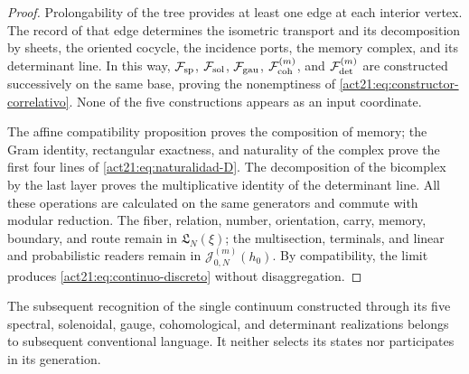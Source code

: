 \begin{proof}
Prolongability of the tree provides at least one edge at each interior
vertex. The record of that edge determines the isometric transport and its
decomposition by sheets, the oriented cocycle, the incidence ports, the
memory complex, and its determinant line. In this way,
\(\mathcal F_{\rm sp}\), \(\mathcal F_{\rm sol}\),
\(\mathcal F_{\rm gau}\), \(\mathcal F_{\rm coh}^{(m)}\), and
\(\mathcal F_{\rm det}^{(m)}\) are constructed successively on the same base, proving the
nonemptiness of \eqref{act21:eq:constructor-correlativo}. None of the five
constructions appears as an input coordinate.

The affine compatibility proposition proves the composition of memory; the
Gram identity, rectangular exactness, and naturality of the complex
prove the first four lines of \eqref{act21:eq:naturalidad-D}. The
decomposition of the bicomplex by the last layer proves the multiplicative
identity of the determinant line. All these operations are calculated
on the same generators and commute with modular reduction. The fiber,
relation, number, orientation, carry, memory, boundary, and
route remain in \(\mathfrak L_N(\xi)\); the multisection, terminals,
and linear and probabilistic readers remain in
\(\mathcal J_{0,N}^{(m)}(h_0)\). By compatibility, the limit produces
\eqref{act21:eq:continuo-discreto} without disaggregation.
\end{proof}

The subsequent recognition of the single continuum constructed through its five
spectral, solenoidal, gauge, cohomological, and determinant realizations
belongs to subsequent conventional language. It neither selects its states nor
participates in its generation.
\fi


